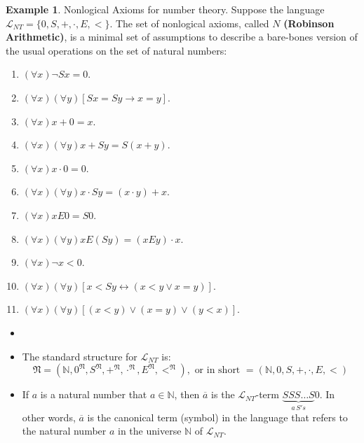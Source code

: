 \documentclass[11pt,letterpaper]{book}
\theoremstyle{definition}
\newtheorem{example}{Example}[section]
\begin{document}
\begin{example}\label{zb:nonlogical_number_theory}
Nonlogical Axioms for number theory. Suppose the language
$\mathcal{L}_{NT} = \{ 0, S, +, \cdot, E, < \}$. The set of nonlogical
axioms, called $N$ \textbf{(Robinson Arithmetic)}, is a minimal set of assumptions to describe a
bare-bones version of the usual operations on the set of natural numbers:
\begin{enumerate}\label{axiom_N}
\item{$ (\forall x) \lnot S x = 0$.}
\item{$ (\forall x)(\forall y) [Sx = Sy \rightarrow x = y] $.}
\item{$ (\forall x) x + 0 = x $.}
\item{$ (\forall x)(\forall y)x + Sy = S(x+y) $.}
\item{$ (\forall x) x \cdot 0 = 0 $.}
\item{$ (\forall x)(\forall y) x \cdot Sy = (x \cdot y) + x $.}
\item{$ (\forall x) x E 0 = S 0 $.}
\item{$ (\forall x)(\forall y) x E (S y) = (x E y) \cdot x $.}
\item{$ (\forall x) \lnot x < 0 $.}
\item{$ (\forall x)(\forall y) [x < Sy \leftrightarrow (x < y \lor x = y
)] $.}
\item{$ (\forall x)(\forall y) [(x<y) \lor (x = y) \lor (y < x) ] $.}

\end{enumerate}

\end{example}


\begin{itemize}
\item[]
\item{The standard structure for $\mathcal{L}_{NT}$ is:
$$ \mathfrak{N} = ( \mathbb{N}, 0^{\mathfrak{N}}, S^{\mathfrak{N}},
+^{\mathfrak{N}}, \cdot ^{\mathfrak{N}}, E ^{\mathfrak{N}}, <
^{\mathfrak{N}} ), \text{ or in short } =(\mathbb{N}, 0, S, +, \cdot, E,
<)$$}
\item{If $a$ is a natural number that $a \in \mathbb{N}$, then
$\overline{a}$ is the $\mathcal{L}_{NT}$-term $ \underbrace{SSS\ldots S
}_{a\, S's} 0 $. In other words, $\overline{a}$ is the canonical term 
(symbol) in the language that refers to the natural number $a$ in the 
universe $\mathbb{N}$
of $\mathcal{L}_{NT}$.}
\end{itemize}
\end{document}

